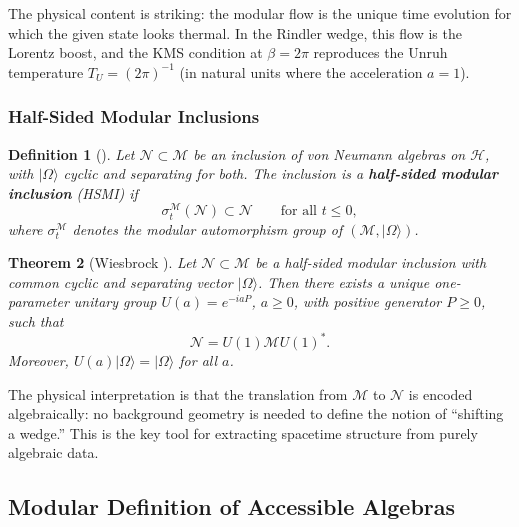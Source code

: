 \documentclass[12pt,a4paper,openany]{book}
\newtheorem{theorem}{Theorem}[chapter]
\newtheorem{definition}[theorem]{Definition}
\begin{document}
The physical content is striking: the modular flow is the unique time evolution for which the given state looks thermal.
In the Rindler wedge, this flow is the Lorentz boost, and the KMS condition at $\beta = 2\pi$ reproduces the Unruh temperature $T_U = (2\pi)^{-1}$ (in natural units where the acceleration $a = 1$).

\subsubsection{Half-Sided Modular Inclusions}

\begin{definition}[{\cite{Wiesbrock1993}}]
Let $\mathcal{N} \subset \mathcal{M}$ be an inclusion of von Neumann algebras on $\mathcal{H}$, with $|\Omega\rangle$ cyclic and separating for both.
The inclusion is a \textbf{half-sided modular inclusion} (HSMI) if
\begin{equation}
\sigma_t^{\mathcal{M}}(\mathcal{N}) \subset \mathcal{N} \qquad \text{for all } t \leq 0,
\end{equation}
where $\sigma_t^{\mathcal{M}}$ denotes the modular automorphism group of $(\mathcal{M}, |\Omega\rangle)$.
\end{definition}

\begin{theorem}[Wiesbrock {\cite{Wiesbrock1993}}]
\label{H-D-thm:Wiesbrock}
Let $\mathcal{N} \subset \mathcal{M}$ be a half-sided modular inclusion with common cyclic and separating vector $|\Omega\rangle$.
Then there exists a unique one-parameter unitary group $U(a) = e^{-iaP}$, $a \geq 0$, with positive generator $P \geq 0$, such that
\begin{equation}
\mathcal{N} = U(1)\mathcal{M} U(1)^*.
\end{equation}
Moreover, $U(a)|\Omega\rangle = |\Omega\rangle$ for all $a$.
\end{theorem}

The physical interpretation is that the translation from $\mathcal{M}$ to $\mathcal{N}$ is encoded algebraically: no background geometry is needed to define the notion of ``shifting a wedge.''
This is the key tool for extracting spacetime structure from purely algebraic data.


\subsection{Modular Definition of Accessible Algebras}
\label{H-D-sec:modular-def}
\end{document}
